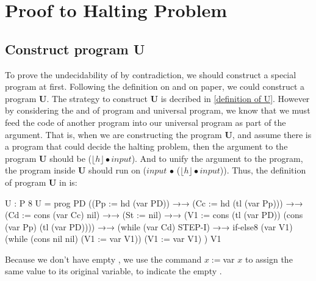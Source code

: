 \section{Proof to Halting Problem}
\subsection{Construct \WHILE program U}
To prove the undecidability of  by contradiction, we should construct a special program at first.
Following the definition on \cite{_halting_2015} and on paper\cite{boyer_mechanical_1984}, we could construct a program \textbf{U}.
The strategy to construct \textbf{U} is decribed in \ref{definition of U}.
However by considering the  and  of \WHILE program and universal \WHILE program, we know that we must feed the code of another program into our universal program as part of the argument.
That is, when we are constructing the program \textbf{U}, and assume there is a program  that could decide the halting problem, then the argument to the program \textbf{U} should be ($\lfloor h\rfloor \bullet input$).
And to unify the argument to the program, the program  inside \textbf{U} should run on ($input$ $\bullet$ ($\lfloor h\rfloor \bullet input$)).
Thus, the definition of program \textbf{U} in \Agda is:
\begin{code}[fontsize=\small]
U : P 8
U = prog PD ((Pp := hd (var PD))
            →→
            (Cc := hd (tl (var Pp)))
            →→
            (Cd := cons (var Cc) nil)
            →→
            (St := nil)
            →→
            (V1 := cons (tl (var PD)) (cons  (var Pp) (tl (var PD))))
            →→
            (while (var Cd) STEP-I)
            →→
            if-else8 (var V1) (while (cons nil nil) (V1 := var V1)) 
			      (V1 := var V1)
            )
          V1
\end{code}
Because we don't have empty , we use the command $x := $var $x$ to assign the same value to its original variable, to indicate the empty .
